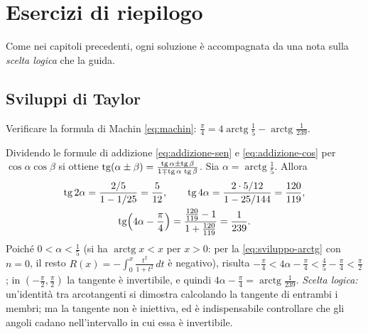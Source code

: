 \section{Esercizi di riepilogo}
\label{sec:esercizi-cap10}

Come nei capitoli precedenti, ogni soluzione è accompagnata da una nota sulla
\emph{scelta logica} che la guida.

\subsection*{Sviluppi di Taylor}

\begin{esercizio}\label{es:machin}
Verificare la formula di Machin \eqref{eq:machin}:
$\frac\pi4=4\operatorname{arctg}\frac15-\operatorname{arctg}\frac1{239}$.
\begin{soluzione}
Dividendo le formule di addizione \eqref{eq:addizione-sen} e \eqref{eq:addizione-cos} per
$\cos\alpha\cos\beta$ si ottiene $\operatorname{tg}(\alpha\pm\beta)=\frac{\operatorname{tg}\alpha\pm\operatorname{tg}\beta}{1\mp\operatorname{tg}\alpha\,\operatorname{tg}\beta}$. Sia $\alpha=\operatorname{arctg}\frac15$.
Allora
\[
\begin{gathered}
  \operatorname{tg}2\alpha=\frac{2/5}{1-1/25}=\frac5{12}, \qquad
  \operatorname{tg}4\alpha=\frac{2\cdot5/12}{1-25/144}=\frac{120}{119},\\
  \operatorname{tg}\Bigl(4\alpha-\frac\pi4\Bigr)=\frac{\frac{120}{119}-1}{1+\frac{120}{119}}=\frac1{239} .
\end{gathered}
\]
Poiché $0<\alpha<\frac15$ (si ha $\operatorname{arctg}x<x$ per $x>0$: per la \eqref{eq:sviluppo-arctg}
con $n=0$, il resto $R(x)=-\int_{0}^{x}\frac{t^{2}}{1+t^{2}}\,dt$ è negativo), risulta
$-\frac\pi4<4\alpha-\frac\pi4<\frac45-\frac\pi4<\frac\pi2$; in $(-\frac\pi2,\frac\pi2)$ la tangente è invertibile, e
quindi $4\alpha-\frac\pi4=\operatorname{arctg}\frac1{239}$. \emph{Scelta logica:} un'identità tra
arcotangenti si dimostra calcolando la tangente di entrambi i membri; ma la tangente non
è iniettiva, ed è indispensabile controllare che gli angoli cadano nell'intervallo in cui
essa è invertibile.
\end{soluzione}
\end{esercizio}

